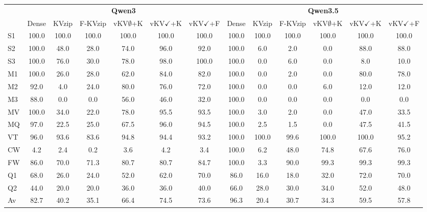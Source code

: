 \footnotesize
\setlength{\tabcolsep}{2.0pt}
\centering
\begin{tabular}{l|cccccc|cccccc}
\toprule
 & \multicolumn{6}{c|}{\textbf{Qwen3}} & \multicolumn{6}{c}{\textbf{Qwen3.5}} \\
 & Dense & KVzip & F-KVzip & vKV$\emptyset$+K & vKV$\checkmark$+K & vKV$\checkmark$+F & Dense & KVzip & F-KVzip & vKV$\emptyset$+K & vKV$\checkmark$+K & vKV$\checkmark$+F \\
\midrule
S1 & 100.0 & 100.0 & 100.0 & 100.0 & 100.0 & 100.0 & 100.0 & 100.0 & 100.0 & 100.0 & 100.0 & 100.0 \\
S2 & 100.0 & 48.0 & 28.0 & 74.0 & 96.0 & 92.0 & 100.0 & 6.0 & 2.0 & 0.0 & 88.0 & 88.0 \\
S3 & 100.0 & 76.0 & 30.0 & 78.0 & 98.0 & 100.0 & 100.0 & 0.0 & 6.0 & 0.0 & 8.0 & 10.0 \\
M1 & 100.0 & 26.0 & 28.0 & 62.0 & 84.0 & 82.0 & 100.0 & 0.0 & 2.0 & 0.0 & 80.0 & 78.0 \\
M2 & 92.0 & 4.0 & 24.0 & 80.0 & 76.0 & 72.0 & 100.0 & 0.0 & 0.0 & 6.0 & 12.0 & 12.0 \\
M3 & 88.0 & 0.0 & 0.0 & 56.0 & 46.0 & 32.0 & 100.0 & 0.0 & 0.0 & 0.0 & 0.0 & 0.0 \\
MV & 100.0 & 34.0 & 22.0 & 78.0 & 95.5 & 93.5 & 100.0 & 3.0 & 2.0 & 0.0 & 47.0 & 33.5 \\
MQ & 97.0 & 22.5 & 25.0 & 67.5 & 96.0 & 94.5 & 100.0 & 2.5 & 1.5 & 0.0 & 47.5 & 41.5 \\
VT & 96.0 & 93.6 & 83.6 & 94.8 & 94.4 & 93.2 & 100.0 & 100.0 & 99.6 & 100.0 & 100.0 & 95.2 \\
CW & 4.2 & 2.4 & 0.2 & 3.6 & 4.2 & 3.4 & 100.0 & 6.2 & 48.0 & 74.8 & 67.6 & 76.0 \\
FW & 86.0 & 70.0 & 71.3 & 80.7 & 80.7 & 84.7 & 100.0 & 3.3 & 90.0 & 99.3 & 99.3 & 99.3 \\
Q1 & 68.0 & 26.0 & 24.0 & 52.0 & 62.0 & 70.0 & 86.0 & 16.0 & 18.0 & 32.0 & 72.0 & 70.0 \\
Q2 & 44.0 & 20.0 & 20.0 & 36.0 & 36.0 & 40.0 & 66.0 & 28.0 & 30.0 & 34.0 & 52.0 & 48.0 \\
\midrule
Av & 82.7 & 40.2 & 35.1 & 66.4 & 74.5 & 73.6 & 96.3 & 20.4 & 30.7 & 34.3 & 59.5 & 57.8 \\
\bottomrule
\end{tabular}
\vspace{0.9em}

